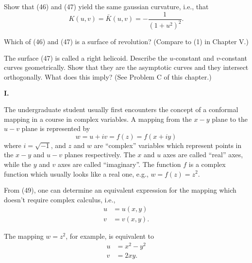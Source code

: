 \documentclass{book}
\begin{document}
Show that (46) and (47) yield the same gaussian curvature, i.e., that
\begin{equation}
K(u,v) = \bar{K}(u,v) = - \frac{1}{(1 + u^{2})^{2}}.
\end{equation}

Which of (46) and (47) is a surface of revolution? (Compare to (1) in Chapter V.)

The surface (47) is called a right helicoid. Describe the $u$-constant and $v$-constant curves geometrically. Show that they are the asymptotic curves and they intersect orthogonally. What does this imply? (See Problem C of this chapter.)

\vspace{0.3cm}

\noindent \textbf{I.}

\vspace{0.3cm}

The undergraduate student usually first encounters the concept of a conformal mapping in a course in complex variables. A mapping from the $x-y$ plane to the $u-v$ plane is represented by
\begin{equation}
w = u + iv = f(z) = f(x + iy)
\end{equation}
where $i = \sqrt{-1}$, and $z$ and $w$ are ``complex'' variables which represent points in the $x-y$ and $u-v$ planes respectively. The $x$ and $u$ axes are called ``real'' axes, while the $y$ and $v$ axes are called ``imaginary''. The function $f$ is a complex function which usually looks like a real one, e.g., $w = f(z) = z^{2}$.

From (49), one can determine an equivalent expression for the mapping which doesn't require complex calculus, i.e.,
\begin{align}
u & = u(x,y) \\
v & = v(x,y).
\end{align}

The mapping $w = z^{2}$, for example, is equivalent to
\begin{align}
u & = x^{2} - y^{2} \\
v & = 2xy.
\end{align}
\end{document}
